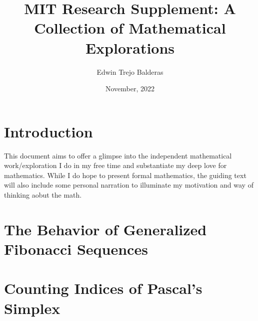 \documentclass[11pt]{article}
\title{MIT Research Supplement: A Collection of Mathematical Explorations}
\author{Edwin Trejo Balderas}
\date{November, 2022}
\begin{document}
\maketitle

\section{Introduction}
This document aims to offer a glimpse into the independent mathematical work/exploration I do in my free time and substantiate my deep love for mathematics. While I do hope to present formal mathematics, the guiding text will also include some personal narration to illuminate my motivation and way of thinking aobut the math.





\section{The Behavior of Generalized Fibonacci Sequences}

\section{Counting Indices of Pascal's Simplex}
\end{document}
